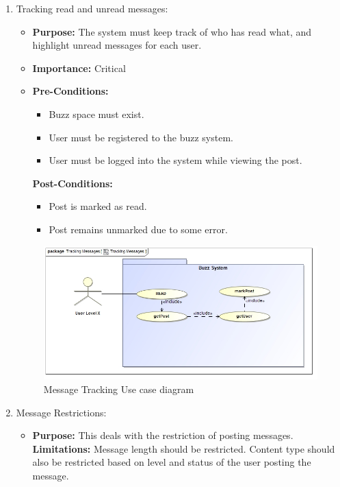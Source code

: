 \documentclass[11pt]{article}
\begin{document}
\begin{enumerate}
\item Tracking read and unread messages:
\begin{itemize}
\item 
\textbf{Purpose:}
The system must keep track of who has read what, and highlight unread messages for each user.
\newline

\item \textbf{Importance:} Critical
\item \textbf{Pre-Conditions: }
	\begin{itemize}
	\item Buzz space must exist.
	\item User must be registered to the buzz system.
	\item User must be logged into the system while viewing the post.
	\end{itemize}

\textbf{Post-Conditions: }
	\begin{itemize}
	\item Post is marked as read.
	\item Post remains unmarked due to some error.
	\end{itemize}

\end{itemize}

\begin{figure}[H]	
    	\includegraphics[scale=0.5]{messageTracking.jpg}
    	\caption{Message Tracking Use case diagram}
	\end{figure}
	
\item Message Restrictions: 
\begin{itemize}
\item \textbf{Purpose:}
This deals with the restriction of posting messages.
\newline
\textbf{Limitations:} 
Message length should be restricted. Content type should also be restricted based on level and status of the user posting the message.


\end{itemize}
\end{enumerate}
\end{document}
